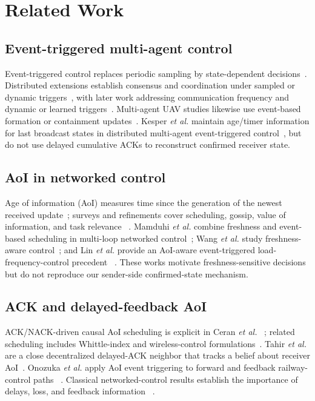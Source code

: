 \section{Related Work}
\label{sec:related}

\subsection{Event-triggered multi-agent control}
Event-triggered control replaces periodic sampling by state-dependent
decisions~\cite{astrom2002riemann,tabuada2007event,heemels2012introduction}.
Distributed extensions establish consensus and coordination under sampled or
dynamic triggers~\cite{dimarogonas2012distributed,seyboth2013eventbased,girard2015dynamic,yi2017distributed,nowzari2019eventtriggered},
with later work addressing communication frequency and dynamic or learned
triggers~\cite{chen2020howoften,ge2021dynamic,zhang2025overview,li2026impulsive}.
Multi-agent UAV studies likewise use event-based formation or containment
updates~\cite{yin2023eventbased,ji2023dynamic,chen2024distributed,yang2025fencing}.
Kesper \emph{et al.} maintain age/timer information for last broadcast states
in distributed multi-agent event-triggered control~\cite{kesper2023toward}, but
do not use delayed cumulative ACKs to reconstruct confirmed receiver state.

\subsection{AoI in networked control}
Age of information (AoI) measures time since the generation of the newest
received update~\cite{kaul2012realtime,sun2017update}; surveys and refinements
cover scheduling, gossip, value of information, and task relevance
~\cite{yates2021aoisurvey,yang2025aoiperspective,kaswan2025gossip,ayan2019aoivoi,rajaraman2021notjustage}.
Mamduhi \emph{et al.} combine freshness and event-based scheduling in
multi-loop networked control~\cite{mamduhi2020freshness}; Wang \emph{et al.}
study freshness-aware control~\cite{wang2021freshness}; and Lin \emph{et al.}
provide an AoI-aware event-triggered load-frequency-control precedent
~\cite{lin2023eventtriggered}. These works motivate freshness-sensitive
decisions but do not reproduce our sender-side confirmed-state mechanism.

\subsection{ACK and delayed-feedback AoI}
ACK/NACK-driven causal AoI scheduling is explicit in Ceran \emph{et al.}
~\cite{ceran2019average}; related scheduling includes Whittle-index and
wireless-control formulations~\cite{tang2022whittle,gatsis2014optimal,park2018wireless}.
Tahir \emph{et al.} are a close decentralized delayed-ACK neighbor that tracks
a belief about receiver AoI~\cite{tahir2024collaborative}. Onozuka \emph{et
al.} apply AoI event triggering to forward and feedback railway-control paths
~\cite{onozuka2024aoi}. Classical networked-control results establish the
importance of delays, loss, and feedback information
~\cite{walsh2002stability,hespanha2007survey,tatikonda2004control,nair2007feedback,molin2013optimality,ramesh2013design,demirel2017tradeoff}.


